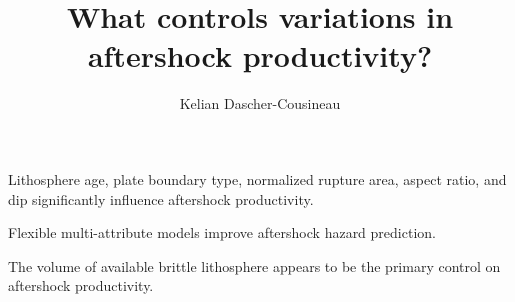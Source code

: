 \documentclass[draft]{agujournal2018}
\author{Kelian Dascher-Cousineau}
\begin{document}
\large
\title{What controls variations in aftershock productivity?}













\begin{keypoints}
\item Lithosphere age, plate boundary type, normalized rupture area, aspect ratio, and dip significantly influence aftershock productivity.
\item Flexible multi-attribute models improve aftershock hazard prediction.
\item The volume of available brittle lithosphere appears to be the primary control on aftershock productivity.
\end{keypoints}
\end{document}
